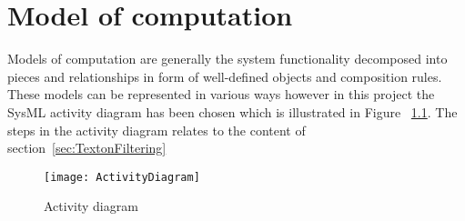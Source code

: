\chapter{Model of computation}

Models of computation are generally the system functionality decomposed into pieces and relationships in form of well-defined objects and composition rules. These models can be represented in various ways however in this project the SysML activity diagram has been chosen which is illustrated in Figure ~\ref{fig:ActivityDiagram}. The steps in the activity diagram relates to the content of section~\ref{sec:TextonFiltering}


\begin{figure}[H]
\centering
\texttt{[image: ActivityDiagram]}
\caption{Activity diagram}
\label{fig:ActivityDiagram}
\end{figure}